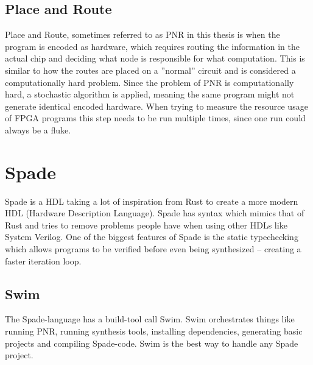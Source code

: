 \subsection{Place and Route}
Place and Route, sometimes referred to as PNR in this thesis is when the program is encoded as hardware, which requires routing the information in the actual chip and deciding what node is responsible for what computation. This is similar to how the routes are placed on a ''normal'' circuit and is considered a computationally hard problem. Since the problem of PNR is computationally hard, a stochastic algorithm is applied, meaning the same program might not generate identical encoded hardware. When trying to measure the resource usage of FPGA programs this step needs to be run multiple times, since one run could always be a fluke.

\section{Spade}
Spade is a HDL taking a lot of inspiration from Rust to create a more modern HDL (Hardware Description Language). Spade has syntax which mimics that of Rust and tries to remove problems people have when using other HDLs like System Verilog. One of the biggest features of Spade is the static typechecking which allows programs to be verified before even being synthesized -- creating a faster iteration loop.
\cite{src:spadeSomething} \cite{src:spadeAnHDL}

\subsection{Swim}
The Spade-language has a build-tool call Swim. Swim orchestrates things like running PNR, running synthesis tools, installing dependencies, generating basic projects and compiling Spade-code. Swim is the best way to handle any Spade project.

